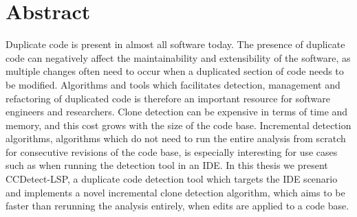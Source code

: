 \chapter*{Abstract}

Duplicate code is present in almost all software today. The presence of duplicate code can
negatively affect the maintainability and extensibility of the software, as multiple
changes often need to occur when a duplicated section of code needs to be modified.
Algorithms and tools which facilitates detection, management and refactoring of duplicated
code is therefore an important resource for software engineers and researchers. Clone
detection can be expensive in terms of time and memory, and this cost grows with the size
of the code base. Incremental detection algorithms, algorithms which do not need to run
the entire analysis from scratch for consecutive revisions of the code base, is especially
interesting for use cases such as when running the detection tool in an IDE. In this
thesis we present CCDetect-LSP, a duplicate code detection tool which targets the IDE
scenario and implements a novel incremental clone detection algorithm, which aims to be
faster than rerunning the analysis entirely, when edits are applied to a code base.
